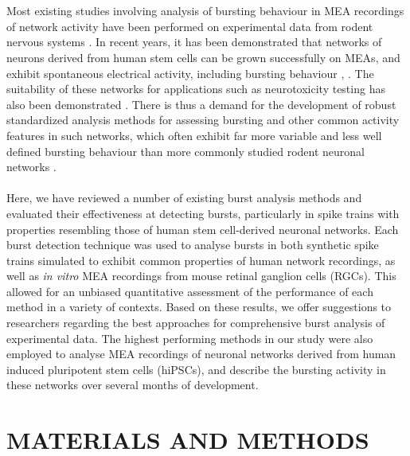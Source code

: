 \documentclass[12pt, titlepage]{article}
\begin{document}
	\\ \\ Most existing studies involving analysis of bursting behaviour in MEA recordings of network activity have been performed on experimental data from rodent nervous systems \cite{Charlesworth2015,Mazzoni2007}. In recent years, it has been demonstrated that networks of neurons derived from human stem cells can be grown successfully on MEAs, and exhibit spontaneous electrical activity, including bursting behaviour \cite{Illes2007}, \cite{Heikkila2009}. The suitability of these networks for applications such as neurotoxicity testing has also been demonstrated \cite{Yla-Outinen2010}. There is thus a demand for the development of robust standardized analysis methods for assessing bursting and other common activity features in such networks, which often exhibit far more variable and less well defined bursting behaviour than more commonly studied rodent neuronal networks \cite{Kapucu2012}.
	\\ \\ Here, we have reviewed a number of existing burst analysis methods and evaluated their effectiveness at detecting bursts, particularly in spike trains with properties resembling those of human stem cell-derived neuronal networks. Each burst detection technique was used to analyse bursts in both synthetic spike trains simulated to exhibit common properties of human network recordings, as well as \textit{in vitro} MEA recordings from mouse retinal ganglion cells (RGCs). This allowed for an unbiased quantitative assessment of the performance of each method in a variety of contexts. Based on these results, we offer suggestions to researchers regarding the best approaches for comprehensive burst analysis of experimental data. The highest performing methods in our study were also employed to analyse MEA recordings of neuronal networks derived from human induced pluripotent stem cells (hiPSCs), and describe the bursting activity in these networks over several months of development.
\section*{MATERIALS AND METHODS}
\end{document}
